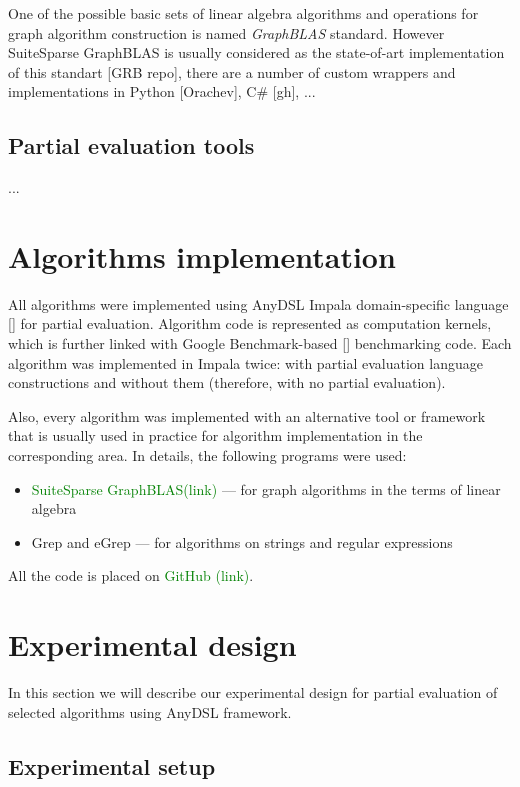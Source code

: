 \documentclass[conference]{IEEEtran}
\begin{document}
One of the possible basic sets of linear algebra algorithms and operations for graph algorithm construction is named \textit{GraphBLAS} standard. However SuiteSparse GraphBLAS is usually considered as the state-of-art implementation of this standart [GRB repo], there are a number of custom wrappers and implementations in Python [Orachev], C\# [gh], ...

\subsection{Partial evaluation tools}
...
\section{Algorithms implementation}

All algorithms were implemented using AnyDSL Impala domain-specific language [] for partial evaluation. Algorithm code is represented as computation kernels, which is further linked with Google Benchmark-based [] benchmarking code. Each algorithm was implemented in Impala twice: with partial evaluation language constructions and without them (therefore, with no partial evaluation).

Also, every algorithm was implemented with an alternative tool or framework that is usually used in practice for algorithm implementation in the corresponding area. In details, the following programs were used:
\begin{itemize}
	\item \textcolor{green}{SuiteSparse GraphBLAS(link)} --- for graph algorithms in the terms of linear algebra
	\item Grep and eGrep --- for algorithms on strings and regular expressions
\end{itemize}

All the code is placed on \textcolor{green}{GitHub (link)}.

\section{Experimental design}

In this section we will describe our experimental design for partial evaluation of selected algorithms using AnyDSL framework.

\subsection{Experimental setup}
\end{document}
